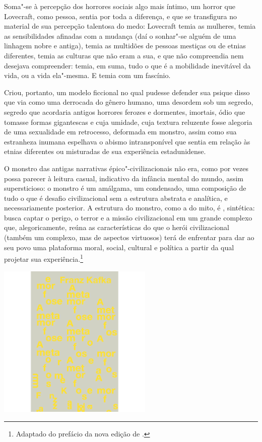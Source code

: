 Soma"-se à percepção dos horrores sociais algo mais íntimo, um horror que Lovecraft, como pessoa, sentia por toda a diferença, e que se
transfigura no material de sua percepção talentosa do medo: Lovecraft
temia as mulheres, temia as sensibilidades afinadas com a mudança (daí o
sonhar"-se alguém de uma linhagem nobre e antiga), temia as multidões de
pessoas mestiças ou de etnias diferentes, temia as culturas que não eram
a sua, e que não compreendia nem desejava compreender: temia, em suma,
tudo o que é a mobilidade inevitável da vida, ou a vida ela"-mesma. E
temia com um fascínio.

Criou, portanto, um modelo ficcional no qual pudesse defender sua psique
disso que via como uma derrocada do gênero humano, uma desordem sob um
segredo, segredo que acordaria antigos horrores ferozes e dormentes,
imortais, ódio que tomasse formas gigantescas e cuja umidade, cuja
textura reluzente fosse alegoria de uma sexualidade em retrocesso,
deformada em monstro, assim como sua
estranheza inumana espelhava o abismo intransponível que sentia em
relação às etnias diferentes ou misturadas de sua experiência
estadunidense.

O monstro das antigas narrativas épico"-civilizacionais não era,
como por vezes possa parecer à leitura casual, indicativo da infância
mental do mundo, assim supersticioso: o monstro é um amálgama, um
condensado, uma composição de tudo o que é desafio civilizacional sem a
estrutura abstrata e analítica, e necessariamente posterior. A estrutura do
monstro, como a do mito, é {}, sintética: busca captar o
perigo, o terror e a missão civilizacional em um grande complexo que,
alegoricamente, reúna as características do que o herói civilizacional
(também um complexo, mas de aspectos virtuosos) terá de enfrentar para
dar ao seu povo uma plataforma moral, social, cultural e política a
partir da qual projetar sua experiência.\footnote[1]{Adaptado do prefácio da nova edição de {}.} 

\pagebreak %

\begin{center}
\hspace*{-3.6cm}
\hspace*{3.1cm}\includegraphics[width=74mm]{./grid/kafka.png}
\end{center}

